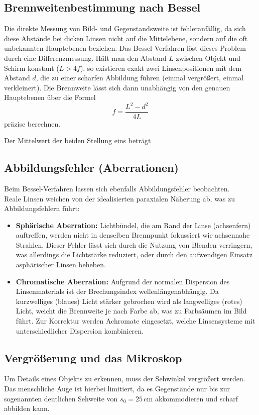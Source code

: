 \documentclass[12pt,a4paper,titlepage]{scrartcl}
\numberwithin{equation}{section}
\numberwithin{table}{section}
\numberwithin{figure}{section}
\begin{document}
\subsection{Brennweitenbestimmung nach Bessel}
Die direkte Messung von Bild- und Gegenstandsweite ist fehleranfällig, da sich diese Abstände bei dicken Linsen nicht auf die Mittelebene, sondern auf die oft unbekannten Hauptebenen beziehen. Das Bessel-Verfahren löst dieses Problem durch eine Differenzmessung. Hält man den Abstand $L$ zwischen Objekt und Schirm konstant ($L > 4f$), so existieren exakt zwei Linsenpositionen mit dem Abstand $d$, die zu einer scharfen Abbildung führen (einmal vergrößert, einmal verkleinert). Die Brennweite lässt sich dann unabhängig von den genauen Hauptebenen über die Formel
\begin{equation}
    f = \frac{L^2 - d^2}{4L} \label{eq:bessel}
\end{equation}
präzise berechnen.

Der Mittelwert der beiden Stellung eins beträgt

\subsection{Abbildungsfehler (Aberrationen)}
Beim Bessel-Verfahren lassen sich ebenfalls Abbildungsfehler beobachten.\\ 
Reale Linsen weichen von der idealisierten paraxialen Näherung ab, was zu Abbildungsfehlern führt:
\begin{itemize}
    \item \textbf{Sphärische Aberration:} Lichtbündel, die am Rand der Linse (achsenfern) auftreffen, werden nicht in denselben Brennpunkt fokussiert wie achsennahe Strahlen. Dieser Fehler lässt sich durch die Nutzung von Blenden verringern, was allerdings die Lichtstärke reduziert, oder durch den aufwendigen Einsatz asphärischer Linsen beheben.
    \item \textbf{Chromatische Aberration:} Aufgrund der normalen Dispersion des Linsenmaterials ist der Brechungsindex wellenlängenabhängig. Da kurzwelliges (blaues) Licht stärker gebrochen wird als langwelliges (rotes) Licht, weicht die Brennweite je nach Farbe ab, was zu Farbsäumen im Bild führt. Zur Korrektur werden Achromate eingesetzt, welche Linsensysteme mit unterschiedlicher Dispersion kombinieren.
\end{itemize}

\subsection{Vergrößerung und das Mikroskop}
Um Details eines Objekts zu erkennen, muss der Sehwinkel vergrößert werden. Das menschliche Auge ist hierbei limitiert, da es Gegenstände nur bis zur sogenannten deutlichen Sehweite von $s_0 = 25\,\text{cm}$ akkommodieren und scharf abbilden kann. 
\end{document}
